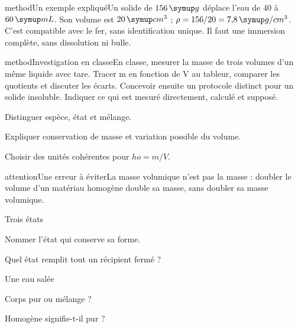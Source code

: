 \begin{pcEncadre}{method}{Un exemple expliqué}Un solide de $156\unite g$ déplace l’eau de 40 à $60\unite{mL}$. Son volume est $20\unite{cm^3}$ ; $\rho=156/20=7{,}8\unite{g/cm^3}$. C’est compatible avec le fer, sans identification unique. Il faut une immersion complète, sans dissolution ni bulle.\end{pcEncadre}
\label{activite-1}
\begin{pcEncadre}{method}{Investigation en classe}En classe, mesurer la masse de trois volumes d’un même liquide avec tare. Tracer m en fonction de V au tableur, comparer les quotients et discuter les écarts. Concevoir ensuite un protocole distinct pour un solide insoluble. Indiquer ce qui est mesuré directement, calculé et supposé.\end{pcEncadre}
\begin{questions}
\item Distinguer espèce, état et mélange.
\item Expliquer conservation de masse et variation possible du volume.
\item Choisir des unités cohérentes pour $
ho=m/V$.
\end{questions}
\begin{pcEncadre}{attention}{Une erreur à éviter}La masse volumique n’est pas la masse : doubler le volume d’un matériau homogène double sa masse, sans doubler sa masse volumique.\end{pcEncadre}
\pcGrille
\clearpage{}
\par\noindent\begin{minipage}{\linewidth}
\begin{exercice}[1]{Trois états}
\begin{questions}
\item Nommer l’état qui conserve sa forme.
\item Quel état remplit tout un récipient fermé ?
\end{questions}
\end{exercice}
\end{minipage}
\par\noindent\begin{minipage}{\linewidth}
\begin{exercice}[1]{Une eau salée}
\begin{questions}
\item Corps pur ou mélange ?
\item Homogène signifie-t-il pur ?
\end{questions}
\end{exercice}
\end{minipage}
